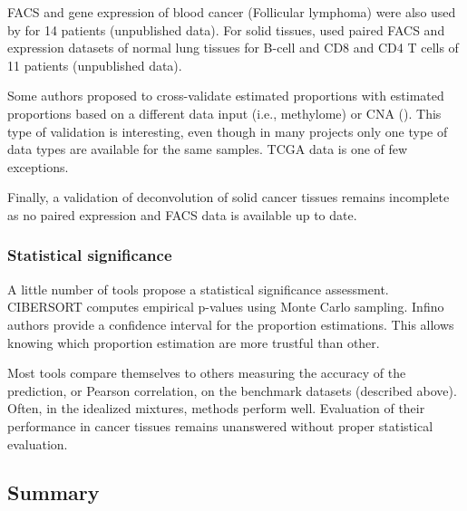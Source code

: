 \documentclass[12pt,]{book}
\theoremstyle{definition}
\theoremstyle{definition}
\theoremstyle{definition}
\theoremstyle{remark}
\begin{document}
FACS and gene expression of blood cancer (Follicular lymphoma) were also
used by \citet{Newman2015} for 14 patients (unpublished data). For solid
tissues, \citet{Newman2015} used paired FACS and expression datasets of
normal lung tissues for B-cell and CD8 and CD4 T cells of 11 patients
(unpublished data).

Some authors proposed to cross-validate estimated proportions with
estimated proportions based on a different data input (i.e., methylome)
\citep[\citet{Senbabaoglu2016}]{Li2016} or CNA
(\citet{Senbabaoglu2016}). This type of validation is interesting, even
though in many projects only one type of data types are available for
the same samples. TCGA data is one of few exceptions.

Finally, a validation of deconvolution of solid cancer tissues remains
incomplete as no paired expression and FACS data is available up to
date.

\hypertarget{statistical-significance}{%
\subsubsection{Statistical
significance}\label{statistical-significance}}

A little number of tools propose a statistical significance assessment.
CIBERSORT computes empirical p-values using Monte Carlo sampling. Infino
authors \citep{Zaslavsky2017} provide a confidence interval for the
proportion estimations. This allows knowing which proportion estimation
are more trustful than other.

Most tools compare themselves to others measuring the accuracy of the
prediction, or Pearson correlation, on the benchmark datasets (described
above). Often, in the idealized mixtures, methods perform well.
Evaluation of their performance in cancer tissues remains unanswered
without proper statistical evaluation.

\hypertarget{summary-2}{%
\subsection{Summary}\label{summary-2}}
\end{document}
